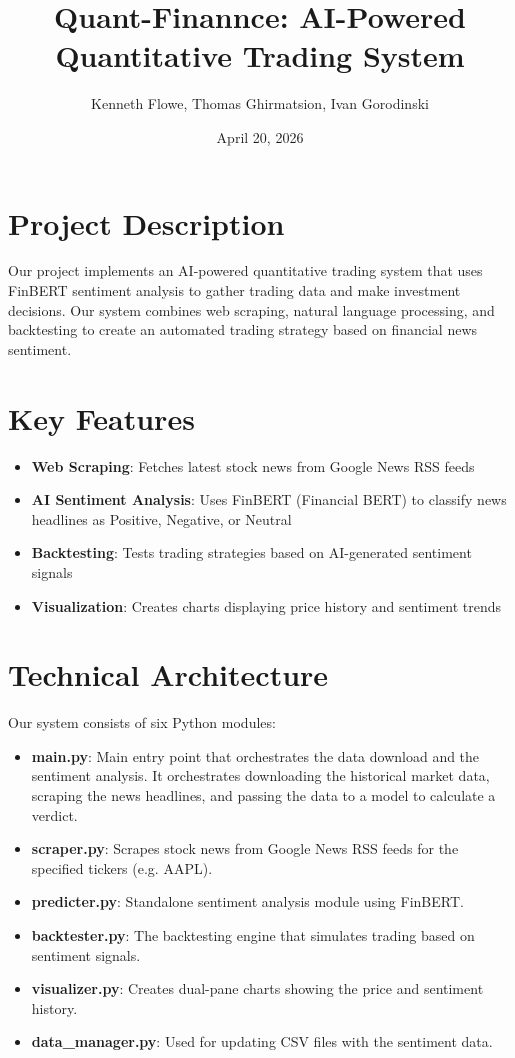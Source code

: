 \documentclass[12pt]{article}
\title{Quant-Finannce: AI-Powered Quantitative Trading System}
\author{Kenneth Flowe, Thomas Ghirmatsion, Ivan Gorodinski}
\date{April 20, 2026}
\begin{document}
\maketitle
\thispagestyle{empty}

\section*{Project Description}

Our project implements an AI-powered quantitative trading system that uses FinBERT sentiment analysis to gather trading data and make investment decisions. Our system combines web scraping, natural language processing, and backtesting to create an automated trading strategy based on financial news sentiment.

\section*{Key Features}

\begin{itemize}[noitemsep]
\item \textbf{Web Scraping}: Fetches latest stock news from Google News RSS feeds
\item \textbf{AI Sentiment Analysis}: Uses FinBERT (Financial BERT) to classify news headlines as Positive, Negative, or Neutral
\item \textbf{Backtesting}: Tests trading strategies based on AI-generated sentiment signals
\item \textbf{Visualization}: Creates charts displaying price history and sentiment trends
\end{itemize}

\section*{Technical Architecture}

Our system consists of six Python modules:

\begin{itemize}
\item \textbf{main.py}: Main entry point that orchestrates the data download and the sentiment analysis. It orchestrates downloading the historical market data, scraping the news headlines, and passing the data to a model to calculate a verdict.
\item \textbf{scraper.py}: Scrapes stock news from Google News RSS feeds for the specified tickers (e.g. AAPL).
\item \textbf{predicter.py}: Standalone sentiment analysis module using FinBERT.
\item \textbf{backtester.py}: The backtesting engine that simulates trading based on sentiment signals.
\item \textbf{visualizer.py}: Creates dual-pane charts showing the price and sentiment history.
\item \textbf{data\_manager.py}: Used for updating CSV files with the sentiment data.
\end{itemize}
\end{document}
